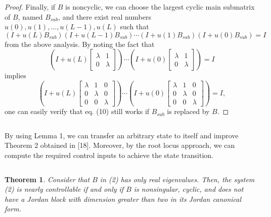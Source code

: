 \documentclass[journal,a4paper,12pt,onecolumn]{IEEEtran}
\newtheorem{theorem}{Theorem}
\begin{document}
\begin{proof}
Finally, if $B$ is noncyclic, we can choose the largest cyclic main
submatrix of $B$, named $B_{sub}$, and there exist real numbers $u\left(
0\right) ,u\left( 1\right) ,\ldots ,u\left( L-1\right) ,u\left( L\right) $
such that\begin{equation}
\left( I+u\left( L\right) B_{sub}\right) \left( I+u\left( L-1\right)
B_{sub}\right) \cdots \left( I+u\left( 1\right) B_{sub}\right) \left(
I+u\left( 0\right) B_{sub}\right) =I
\end{equation}from the above analysis. By noting the fact that\begin{equation*}
\left( I+u\left( L\right) \left[
\begin{array}{cc}
\lambda & 1 \\
0 & \lambda \end{array}\right] \right) \cdots \left( I+u\left( 0\right) \left[
\begin{array}{cc}
\lambda & 1 \\
0 & \lambda \end{array}\right] \right) =I
\end{equation*}implies\begin{equation*}
\left( I+u\left( L\right) \left[
\begin{array}{ccc}
\lambda & 1 & 0 \\
0 & \lambda & 0 \\
0 & 0 & \lambda \end{array}\right] \right) \cdots \left( I+u\left( 0\right) \left[
\begin{array}{ccc}
\lambda & 1 & 0 \\
0 & \lambda & 0 \\
0 & 0 & \lambda \end{array}\right] \right) =I,
\end{equation*}one can easily verify that eq. (10) still works if $B_{sub}$ is replaced by $B$.
\end{proof}

$\left. {}\right. $

By using Lemma 1, we can transfer an arbitrary state to itself and improve
Theorem 2 obtained in [18]. Moreover, by the root locus approach, we can
compute the required control inputs to achieve the state transition.

$\left. {}\right. $

\begin{theorem}
Consider that $B$ in (2) has only real eigenvalues. Then, the system (2) is
nearly controllable if and only if $B$ is nonsingular, cyclic, and does not
have a Jordan block with dimension greater than two in its Jordan canonical
form.
\end{theorem}
\end{document}
